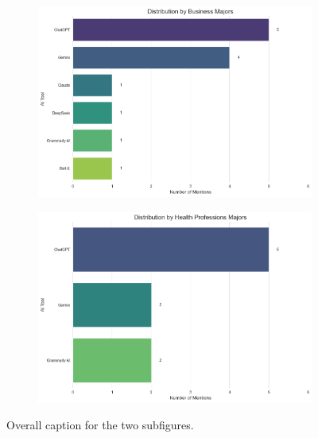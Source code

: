 \documentclass[12pt]{article}
\begin{document}
\begin{figure}[htbp]
\begin{subfigure}[b]{0.45\textwidth}
    \label{fig:subfig1b}
  \end{subfigure}
  \hfill %
  \begin{subfigure}[b]{0.45\textwidth}
    \includegraphics[width=\textwidth]{fig4-3.png} %
    \label{fig:subfig1b}
  \end{subfigure}
  \hfill %
  \begin{subfigure}[b]{0.45\textwidth}
    \includegraphics[width=\textwidth]{fig4-4.png} %
    \label{fig:subfig1b}
  \end{subfigure}
  \caption{Overall caption for the two subfigures.}
  \label{fig:subfigures1}
\end{figure}
\end{document}
